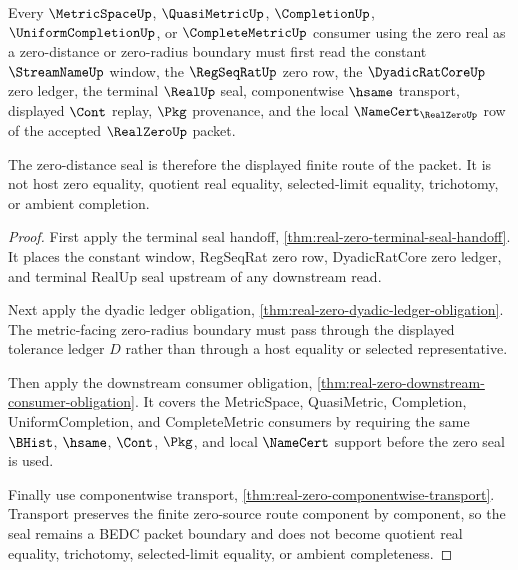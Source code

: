 \begin{theorem}
\label{thm:realzero-zero-distance-seal}
Every $\MetricSpaceUp$, $\QuasiMetricUp$, $\CompletionUp$, $\UniformCompletionUp$, or $\CompleteMetricUp$ consumer using the zero real as a zero-distance or zero-radius boundary must first read the constant $\StreamNameUp$ window, the $\RegSeqRatUp$ zero row, the $\DyadicRatCoreUp$ zero ledger, the terminal $\RealUp$ seal, componentwise $\hsame$ transport, displayed $\Cont$ replay, $\Pkg$ provenance, and the local $\NameCert_{\RealZeroUp}$ row of the accepted $\RealZeroUp$ packet.

The zero-distance seal is therefore the displayed finite route of the packet. It is not host zero equality, quotient real equality, selected-limit equality, trichotomy, or ambient completion.
\end{theorem}
\begin{proof}
First apply the terminal seal handoff, \autoref{thm:real-zero-terminal-seal-handoff}. It places the constant window, RegSeqRat zero row, DyadicRatCore zero ledger, and terminal RealUp seal upstream of any downstream read.

Next apply the dyadic ledger obligation, \autoref{thm:real-zero-dyadic-ledger-obligation}. The metric-facing zero-radius boundary must pass through the displayed tolerance ledger $D$ rather than through a host equality or selected representative.

Then apply the downstream consumer obligation, \autoref{thm:real-zero-downstream-consumer-obligation}. It covers the MetricSpace, QuasiMetric, Completion, UniformCompletion, and CompleteMetric consumers by requiring the same $\BHist$, $\hsame$, $\Cont$, $\Pkg$, and local $\NameCert$ support before the zero seal is used.

Finally use componentwise transport, \autoref{thm:real-zero-componentwise-transport}. Transport preserves the finite zero-source route component by component, so the seal remains a BEDC packet boundary and does not become quotient real equality, trichotomy, selected-limit equality, or ambient completeness.
\end{proof}

